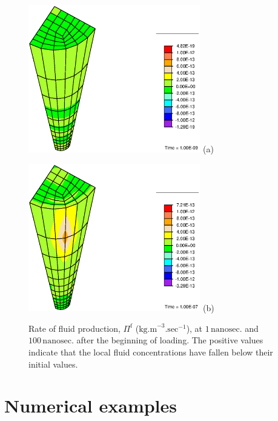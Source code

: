 \begin{figure}[ht]
\begin{minipage}[t]{7.5cm}
{\includegraphics[width=7.5cm]{images/Pi-1.eps}} \hskip 3cm (a)
\end{minipage}
\begin{minipage}[t]{7.5cm}
{\includegraphics[width=7.5cm]{images/Pi-100.eps}} \hskip 3cm (b)
\end{minipage}
\caption{Rate of fluid production, $\Pi^\mathrm{f}$
($\mathrm{kg.m}^{-3}.\mathrm{sec}^{-1}$), at $1
\,\mathrm{nanosec.}$ and $100\,\mathrm{nanosec.}$ after the
beginning of loading. The positive values indicate that the local
fluid concentrations have fallen below their initial values.}
\label{Pifig}
\end{figure}

\section{Numerical examples}
\label{numericalimplementation}

